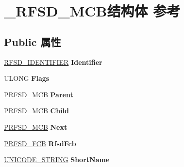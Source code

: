 \hypertarget{struct___r_f_s_d___m_c_b}{}\section{\+\_\+\+R\+F\+S\+D\+\_\+\+M\+C\+B结构体 参考}
\label{struct___r_f_s_d___m_c_b}
\subsection*{Public 属性}
\begin{DoxyCompactItemize}
\item 
\mbox{\label{struct___r_f_s_d___m_c_b_aec45f21e200665a2f1c32a27a8034e8b}} 
\hyperlink{struct___r_f_s_d___i_d_e_n_t_i_f_i_e_r}{R\+F\+S\+D\+\_\+\+I\+D\+E\+N\+T\+I\+F\+I\+ER} {\bfseries Identifier}
\item 
\mbox{\label{struct___r_f_s_d___m_c_b_ae7bd181ccc9501a4529c7afa8f53cfb6}} 
U\+L\+O\+NG {\bfseries Flags}
\item 
\mbox{\label{struct___r_f_s_d___m_c_b_a8f68bc5a173d037ee2d080111003d75c}} 
\hyperlink{struct___r_f_s_d___m_c_b}{P\+R\+F\+S\+D\+\_\+\+M\+CB} {\bfseries Parent}
\item 
\mbox{\label{struct___r_f_s_d___m_c_b_a4c9023e07b36d4b1ac51069305e5a2fa}} 
\hyperlink{struct___r_f_s_d___m_c_b}{P\+R\+F\+S\+D\+\_\+\+M\+CB} {\bfseries Child}
\item 
\mbox{\label{struct___r_f_s_d___m_c_b_ac52d5d2fd083fe08cfa383eede527ec6}} 
\hyperlink{struct___r_f_s_d___m_c_b}{P\+R\+F\+S\+D\+\_\+\+M\+CB} {\bfseries Next}
\item 
\mbox{\label{struct___r_f_s_d___m_c_b_ae866d4859ec9683fc7a946792efcfada}} 
\hyperlink{struct___r_f_s_d___f_c_b}{P\+R\+F\+S\+D\+\_\+\+F\+CB} {\bfseries Rfsd\+Fcb}
\item 
\mbox{\label{struct___r_f_s_d___m_c_b_a70aac45a5214f4dbb2dec366e3cb99dc}} 
\hyperlink{struct___u_n_i_c_o_d_e___s_t_r_i_n_g}{U\+N\+I\+C\+O\+D\+E\+\_\+\+S\+T\+R\+I\+NG} {\bfseries Short\+Name}
\item 

\end{DoxyCompactItemize}
